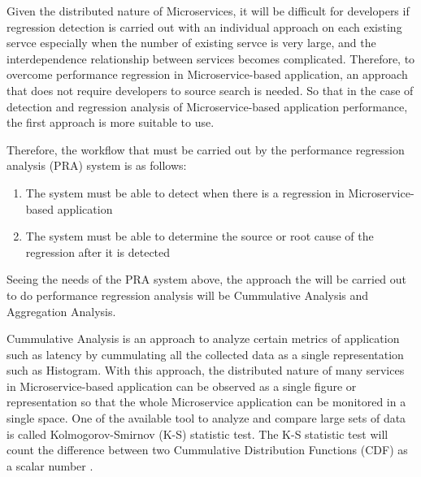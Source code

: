 \documentclass[conference]{configs/IEEEtran}
\begin{document}
Given the distributed nature of Microservices, it will be difficult for developers if regression detection is carried out with an individual approach on each existing servce especially when the number of existing servce is very large, and the interdependence relationship between services becomes complicated. Therefore, to overcome performance regression in Microservice-based application, an approach that does not require developers to source search is needed. So that in the case of detection and regression analysis of Microservice-based application performance, the first approach is more suitable to use.

Therefore, the workflow that must be carried out by the performance regression analysis (PRA) system is as follows:
\begin{enumerate}
	\item The system must be able to detect when there is a regression in Microservice-based application
	\item The system must be able to determine the source or root cause of the regression after it is detected
\end{enumerate}

Seeing the needs of the PRA system above, the approach the will be carried out to do performance regression analysis will be Cummulative Analysis and Aggregation Analysis. 

Cummulative Analysis is an approach to analyze certain metrics of application such as latency by cummulating all the collected data as a single representation such as Histogram. With this approach, the distributed nature of many services in Microservice-based application can be observed as a single figure or representation so that the whole Microservice application can be monitored in a single space. One of the available tool to analyze and compare large sets of data is called Kolmogorov-Smirnov (K-S) statistic test. The K-S statistic test will count the difference between two Cummulative Distribution Functions (CDF) as a scalar number \cite{kolmogorov_1951}.
\end{document}
